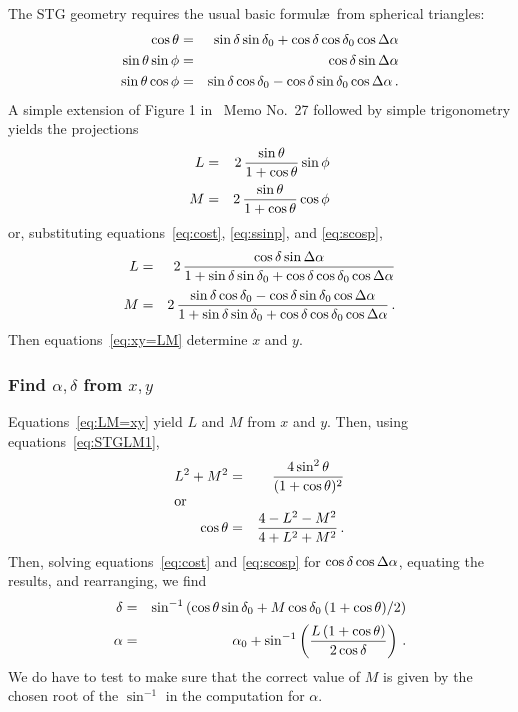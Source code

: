      The STG geometry requires the usual basic formul\ae\ from
spherical triangles:
\begin{eqnarray}
 \cos\theta & = &\sin\delta\sin\delta_0+\cos\delta \cos\delta_0
                 \cos\Delta \alpha  \label{eq:cost}\\
 \sin\theta \sin\phi & = &\cos\delta \sin\Delta\alpha  \label{eq:ssinp}\\
 \sin\theta \cos\phi & = &\sin\delta \cos\delta_0 - \cos\delta
                  \sin\delta_0 \cos\Delta\alpha \, .  \label{eq:scosp}
\end{eqnarray}
A simple extension of Figure 1 in \AIPS\ Memo No.~27 followed by
simple trigonometry yields the projections
\begin{eqnarray}
   L & = &2\,\frac{\sin\theta}{1+\cos\theta} \sin\phi \nonumber \\
 \noalign{\vskip 0.8pt}
   M & = &2\,\frac{\sin\theta}{1+\cos\theta}\cos\phi \label{eq:STGLM1}
\end{eqnarray}
or, substituting equations~\ref{eq:cost}, \ref{eq:ssinp}, and
\ref{eq:scosp},
\begin{eqnarray}
   L & = &2\,\frac{\cos\delta\sin\da}{1+\sin\delta\sin\delta_0
               +\cos\delta\cos\delta_0\cos\da} \nonumber \\
 \noalign{\vskip 1.5pt}
   M & = &2\,\frac{\sin\delta\cos\delta_0-\cos\delta\sin\delta_0
            \cos\da}{1 + \sin\delta\sin\delta_0
           + \cos\delta\cos\delta_0\cos\da} \, .  \label{eq:STGLM2}
\end{eqnarray}
Then equations~\ref{eq:xy=LM} determine $x$ and $y$.

\subsubsection{Find $\alpha,\delta$ from $x,y$}

     Equations~\ref{eq:LM=xy} yield $L$ and $M$ from $x$ and $y$.
Then, using equations~\ref{eq:STGLM1},
\begin{eqnarray*}
   L^2+M^2 & = &\frac{4\sin^2\theta}{(1+\cos\theta)^2} \\
\noalign{\hbox{or}}
   \cos\theta & = &\frac{4-L^2-M^2}{4+L^2+M^2} \, .
\end{eqnarray*}
Then, solving equations~\ref{eq:cost} and \ref{eq:scosp} for
$\cos\delta\cos\Delta\alpha$, equating the results, and rearranging,
we find
\begin{eqnarray*}
   \delta & = &\sin^{-1}\left(\cos\theta\sin\delta_0 +
                M\cos\delta_0\,(1+\cos\theta)/2 \right) \\
 \noalign{\vskip 1.5pt}
   \alpha & = &\alpha_0 + \sin^{-1}\left( \frac{L\,(1+\cos\theta)}{
                     2\cos\delta}\right) \, .
\end{eqnarray*}
We do have to test to make sure that the correct value of $M$ is given
by the chosen root of the $\sin^{-1}$ in the computation for $\alpha$.

